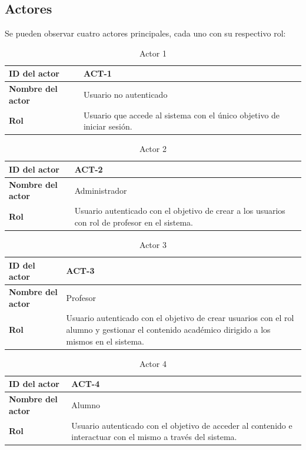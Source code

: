 \subsection {Actores}
Se pueden observar cuatro actores principales, cada uno con su respectivo rol:
\begin{table}[h!]
\centering
\begin{tabularx}{\textwidth}{
  |>{\centering\arraybackslash}l
  |>{\centering\arraybackslash}X|
}
\hline
\textbf{ID del actor} & \textbf{ACT-1} \\ \hline
\textbf{Nombre del actor} & Usuario no autenticado \\ \hline
\textbf{Rol} & Usuario que accede al sistema con el único objetivo de iniciar sesión. \\ \hline
\end{tabularx}
\caption{Actor 1}
\end{table}
\begin{table}[h!]
\centering
\begin{tabularx}{\textwidth}{
  |>{\centering\arraybackslash}l
  |>{\centering\arraybackslash}X|    
}
\hline
\textbf{ID del actor} & \textbf{ACT-2} \\ \hline
\textbf{Nombre del actor} & Administrador \\ \hline
\textbf{Rol} & Usuario autenticado con el objetivo de crear a los usuarios con rol de profesor en el sistema. \\ \hline
\end{tabularx}
\caption{Actor 2}
\end{table}
\begin{table}[h!]
\centering
\begin{tabularx}{\textwidth}{
  |>{\centering\arraybackslash}l
  |>{\centering\arraybackslash}X|
}
\hline
\textbf{ID del actor} & \textbf{ACT-3} \\ \hline
\textbf{Nombre del actor} & Profesor \\ \hline
\textbf{Rol} & Usuario autenticado con el objetivo de crear usuarios con el rol alumno y gestionar el contenido académico dirigido a los mismos en el sistema. \\ \hline
\end{tabularx}
\caption{Actor 3}
\end{table}
\begin{table}[h!]
\centering
\begin{tabularx}{\textwidth}{
  |>{\centering\arraybackslash}l
  |>{\centering\arraybackslash}X|
}
\hline
\textbf{ID del actor} & \textbf{ACT-4} \\ \hline
\textbf{Nombre del actor} & Alumno \\ \hline
\textbf{Rol} & Usuario autenticado con el objetivo de acceder al contenido e interactuar con el mismo a través del sistema. \\ \hline
\end{tabularx}
\caption{Actor 4}
\end{table}
